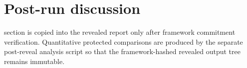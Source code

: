 \section*{Post-run discussion}\nThis section is copied into the revealed report only after framework commitment verification. Quantitative protected comparisons are produced by the separate post-reveal analysis script so that the framework-hashed revealed output tree remains immutable.\n